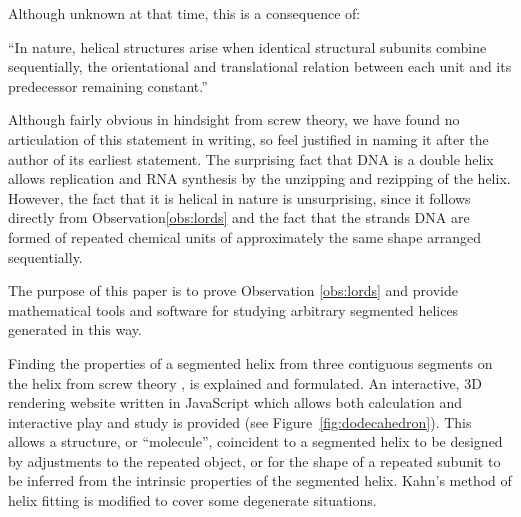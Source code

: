 \documentclass[mathematics,article,submit,pdftex,moreauthors]{Definitions/mdpi}
\begin{document}
Although unknown at that time, this is a consequence of:
\begin{observation}
  “In nature, helical structures arise when identical structural subunits combine sequentially, the orientational and translational relation between each unit and its predecessor remaining constant.” \cite{lord2002helical}
  \label{obs:lords}
\end{observation}
Although fairly obvious in hindsight from screw theory, we have found no articulation of this statement
in writing, so feel justified in naming it after the author of its earliest statement.
The surprising fact that DNA is a double helix allows replication and RNA synthesis by the unzipping and rezipping
of the helix.
However, the fact that it is helical in nature is unsurprising, since it follows directly from Observation\ref{obs:lords} and the
fact that the strands DNA are formed of repeated chemical units of approximately the same shape arranged sequentially.

The purpose of this paper is to prove Observation \ref{obs:lords} and provide mathematical
tools and software for studying arbitrary
segmented helices generated in this way.

Finding the properties of a segmented helix from three contiguous segments on the helix from screw theory \cite{abbasi2015review,wittenburg2016kinematics,wiki:screwaxis,kahn1989defining},
is explained and formulated.
An interactive, 3D rendering website written in JavaScript which allows both calculation and
interactive play and study is provided \cite{segmentedhelixinteractive}
(see Figure~\ref{fig:dodecahedron}). This allows
a structure, or ``molecule'', coincident to a segmented helix to be designed
by adjustments to the repeated object, or for the shape of
a repeated subunit to be inferred from the intrinsic properties of the
segmented helix.
Kahn's method of helix fitting \cite{kahn1989defining,enkhbayar2008helfit,lee2007qhelix} is modified to cover some degenerate situations.
\end{document}
